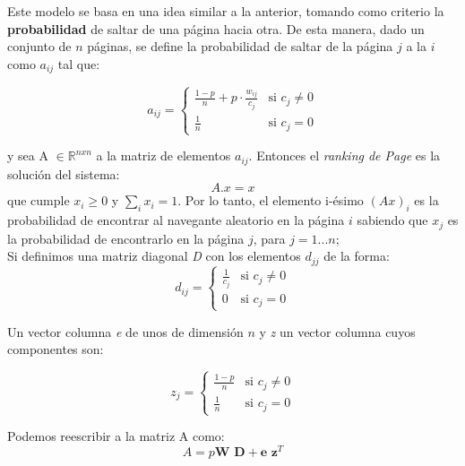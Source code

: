 Este modelo se basa en una idea similar a la anterior, tomando como criterio la \textbf{probabilidad} de saltar de una página hacia otra. De esta manera, dado un conjunto de $n$ páginas, se define la probabilidad de saltar de la página $j$ a la $i$ como $a_{ij}$ tal que:

$$
    a_{ij} =
    \begin{cases}
      \frac{1-p}{n} + p \cdot \frac{w_{ij}}{c_j} & \text{si } c_j \neq 0 \\
      \frac{1}{n} & \text{si } c_j = 0
    \end{cases}
$$

y sea A $\in  \mathbb{R}^{nxn}$ a la matriz de elementos $a_{ij}$. Entonces el \textit{ranking de Page} es la soluci\'on del sistema:
\begin{equation*}
	A.x = x
\end{equation*}
que cumple $x_{i} \geq 0$ y $ \displaystyle\sum_{i} x_{i} = 1$.
Por lo tanto, el elemento i-\'esimo $(Ax)_{i}$ es la probabilidad de encontrar al navegante aleatorio en la p\'agina $i$ sabiendo que $x_{j}$ es la probabilidad de encontrarlo en la p\'agina $j$, para $j = 1 . . . n$;\\
Si definimos una matriz diagonal \textit{D} con los elementos $d_{jj}$ de la forma:
$$
    d_{ij} =
    \begin{cases}
      \frac{1}{c_{j}} & \text{si } c_j \neq 0 \\
      0 & \text{si } c_j = 0
    \end{cases}
$$

Un vector columna \textit{e} de unos de dimensi\'on $n$ y \textit{z} un vector columna cuyos componentes son:

$$
    z_{j} =
    \begin{cases}
      \frac{1-p}{n} & \text{si } c_j \neq 0 \\
      \frac{1}{n} & \text{si } c_j = 0
    \end{cases}
$$

Podemos reescribir a la matriz A como: \\
\begin{equation*}
A = \textit{p} \textbf{W D} + \textbf{e z}^T
\end{equation*}

